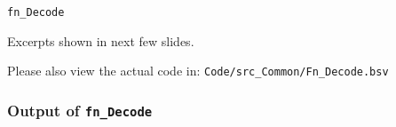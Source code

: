 \begin{frame}

\begin{center}
  {\LARGE\tt fn\_Decode}

  \vspace{5ex}

  Excerpts shown in next few slides.

  Please also view the actual code in:
  {\tt Code/src\_Common/Fn\_Decode.bsv}

\end{center}

\end{frame}


\begin{frame}[fragile]
\frametitle{Output of {\tt fn\_Decode}}

\footnotesize


\end{frame}


